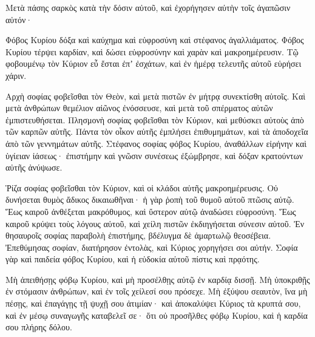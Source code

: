 {Μετὰ πάσης σαρκὸς κατὰ τὴν δόσιν αὐτοῦ, καὶ ἐχορήγησεν αὐτὴν τοῖς ἀγαπῶσιν αὐτόν·
\par }{\PP {}Φόβος Κυρίου δόξα καὶ καύχημα καὶ εὐφροσύνη καὶ στέφανος ἀγαλλιάματος.
Φόβος Κυρίου τέρψει καρδίαν, καὶ δώσει εὐφροσύνην καὶ χαρὰν καὶ μακροημέρευσιν.
Τῷ φοβουμένῳ τὸν Κύριον εὖ ἔσται ἐπʼ ἐσχάτων, καὶ ἐν ἡμέρᾳ τελευτῆς αὐτοῦ εὑρήσει χάριν.
\par }{\PP {}Αρχὴ σοφίας φοβεῖσθαι τὸν Θεὸν, καὶ μετὰ πιστῶν ἐν μήτρᾳ συνεκτίσθη αὐτοῖς.
Καὶ μετὰ ἀνθρώπων θεμέλιον αἰῶνος ἐνόσσευσε, καὶ μετὰ τοῦ σπέρματος αὐτῶν ἐμπιστευθήσεται.
Πλησμονὴ σοφίας φοβεῖσθαι τὸν Κύριον, καὶ μεθύσκει αὐτοὺς ἀπὸ τῶν καρπῶν αὐτῆς.
Πάντα τὸν οἶκον αὐτῆς ἐμπλήσει ἐπιθυμημάτων, καὶ τὰ ἀποδοχεῖα ἀπὸ τῶν γεννημάτων αὐτῆς.
Στέφανος σοφίας φόβος Κυρίου, ἀναθάλλων εἰρήνην καὶ ὑγίειαν ἰάσεως·
ἐπιστήμην καὶ γνῶσιν συνέσεως ἐξώμβρησε, καὶ δόξαν κρατούντων αὐτῆς ἀνύψωσε.
\par }{\PP {}Ῥίζα σοφίας φοβεῖσθαι τὸν Κύριον, καὶ οἱ κλάδοι αὐτῆς μακροημέρευσις.
Οὐ δυνήσεται θυμὸς ἄδικος δικαιωθῆναι· ἡ γὰρ ῥοπὴ τοῦ θυμοῦ αὐτοῦ πτῶσις αὐτῷ.
Ἕως καιροῦ ἀνθέξεται μακρόθυμος, καὶ ὕστερον αὐτῷ ἀναδώσει εὐφροσύνη.
Ἕως καιροῦ κρύψει τοὺς λόγους αὐτοῦ, καὶ χείλη πιστῶν ἐκδιηγήσεται σύνεσιν αὐτοῦ.
Ἐν θησαυροῖς σοφίας παραβολὴ ἐπιστήμης, βδέλυγμα δὲ ἁμαρτωλῷ θεοσέβεια.
Ἐπεθύμησας σοφίαν, διατήρησον ἐντολὰς, καὶ Κύριος χορηγήσει σοι αὐτήν.
Σοφία γὰρ καὶ παιδεία φόβος Κυρίου, καὶ ἡ εὐδοκία αὐτοῦ πίστις καὶ πρᾳότης.
\par }{\PP {}Μὴ ἀπειθήσῃς φόβῳ Κυρίου, καὶ μὴ προσέλθῃς αὐτῷ ἐν καρδίᾳ δισσῇ.
Μὴ ὑποκριθῇς ἐν στόμασιν ἀνθρώπων, καὶ ἐν τοῖς χείλεσί σου πρόσεχε.
Μὴ ἐξύψου σεαυτὸν, ἵνα μὴ πέσῃς, καὶ ἐπαγάγῃς τῇ ψυχῇ σου ἀτιμίαν· καὶ ἀποκαλύψει Κύριος τὰ κρυπτά σου, καὶ ἐν μέσῳ συναγωγῆς καταβελεῖ σε· ὅτι οὐ προσῆλθες φόβῳ Κυρίου, καὶ ἡ καρδία σου πλήρης δόλου.

}
